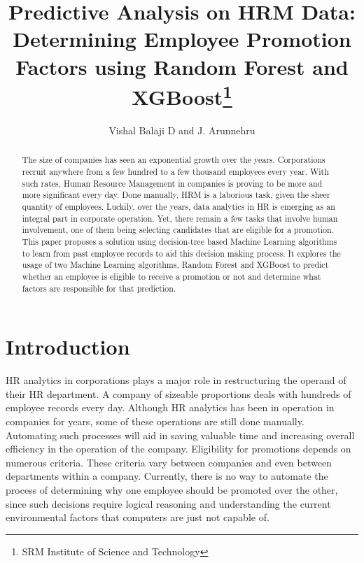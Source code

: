 \documentclass[runningheads]{llncs}
\institute{Department of Computer Science and Engineering,\\
SRM Institute of Science and Technology, Vadapalani Campus, Chennai -
26, \\ \texttt{\{vishalbalaji,arunnehru.aucse\}@gmail.com}}
\title{Predictive Analysis on HRM Data: Determining Employee Promotion
Factors using Random Forest and XGBoost\thanks{SRM Institute of Science
and Technology}}
\author{Vishal Balaji D and J. Arunnehru\orcidID{0000-0002-2245-5001}}
\date{}
\begin{document}
\maketitle
\begin{abstract}
	The size of companies has seen an exponential growth over the years.
 Corporations recruit anywhere from a few hundred to a few thousand
 employees every year. With such rates, Human Resource Management in
 companies is proving to be more and more significant every day. Done
 manually, HRM is a laborious task, given the sheer quantity of
 employees. Luckily, over the years, data analytics in HR is emerging as
 an integral part in corporate operation. Yet, there remain a few tasks
 that involve human involvement, one of them being selecting candidates
 that are eligible for a promotion. This paper proposes a solution using
 decision-tree based Machine Learning algorithms to learn from past
 employee records to aid this decision making process. It explores the
 usage of two Machine Learning algorithms, Random Forest and XGBoost to
 predict whether an employee is eligible to receive a promotion or not
 and determine what factors are responsible for that prediction.

	
\end{abstract}

\hypertarget{introduction}{%
\section{Introduction}\label{introduction}}

HR analytics\cite{ref_Quddus2019} in corporations
plays a major role in restructuring the operand of their HR department.
A company of sizeable proportions deals with hundreds of employee
records every day. Although HR analytics has been in operation in
companies for years, some of these operations are still done manually.
Automating such processes will aid in saving valuable time and
increasing overall efficiency in the operation of the company.
Eligibility for promotions depends on numerous criteria. These criteria
vary between companies and even between departments within a company.
Currently, there is no way to automate the process of determining why
one employee should be promoted over the other, since such decisions
require logical reasoning and understanding the current environmental
factors that computers are just not capable of.
\end{document}

